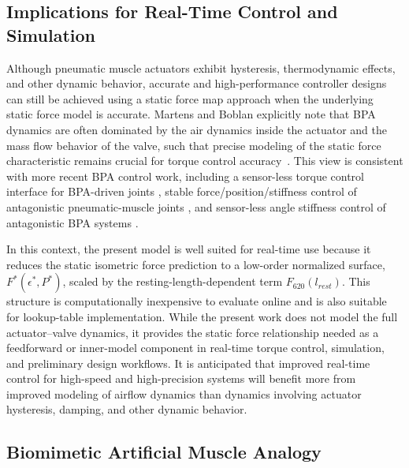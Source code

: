\documentclass[actuators,article,accept,pdftex,moreauthors]{Definitions/mdpi}
\begin{document}
\subsection{Implications for Real-Time Control and Simulation}

Although pneumatic muscle actuators exhibit hysteresis, thermodynamic effects, and other dynamic behavior, accurate and high-performance controller designs can still be achieved using a static force map approach when the underlying static force model is accurate. Martens and Boblan explicitly note that BPA dynamics are often dominated by the air dynamics inside the actuator and the mass flow behavior of the valve, such that precise modeling of the static force characteristic remains crucial for torque control \mbox{accuracy \citep{martens_modeling_2017}.} This view is consistent with more recent BPA control work, including a sensor-less torque control interface for BPA-driven joints \citep{martens_framework_2018}, stable force/position/stiffness control of antagonistic pneumatic-muscle joints \citep{ugurlu2019stable, hunt_development_2017}, and sensor-less angle stiffness control of antagonistic BPA systems \citep{shinSensorlessAngleStiffness2022}. 

In this context, the present model is well suited for real-time use because it reduces the static isometric force prediction to a low-order normalized surface, $F^*(\epsilon^*,P^*)$, scaled by the resting-length-dependent term $F_{620}(l_{rest})$. This structure is computationally inexpensive to evaluate online and is also suitable for lookup-table implementation. While the present work does not model the full actuator--valve dynamics, it provides the static force relationship needed as a feedforward or inner-model component in real-time torque control, simulation, and preliminary design workflows. It is anticipated that improved real-time control for high-speed and high-precision systems will benefit more from improved modeling of airflow dynamics than dynamics involving actuator hysteresis, damping, and other dynamic behavior.


\subsection{Biomimetic Artificial Muscle Analogy}
\end{document}
